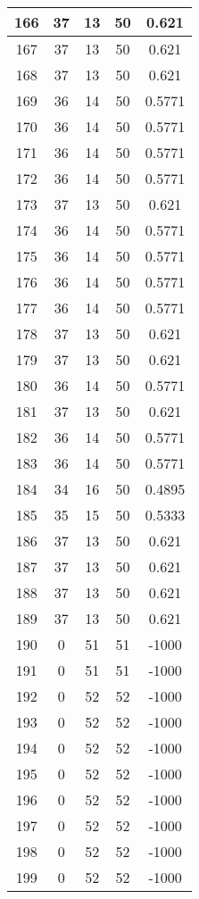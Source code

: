 \documentclass[letterpaper, 12pt]{article}
\begin{document}
\begin{longtable}{|c|c|c|c|c|}
\hline
166 & 37 & 13 & 50 & 0.621 \\
\hline
167 & 37 & 13 & 50 & 0.621 \\
\hline
168 & 37 & 13 & 50 & 0.621 \\
\hline
169 & 36 & 14 & 50 & 0.5771 \\
\hline
170 & 36 & 14 & 50 & 0.5771 \\
\hline
171 & 36 & 14 & 50 & 0.5771 \\
\hline
172 & 36 & 14 & 50 & 0.5771 \\
\hline
173 & 37 & 13 & 50 & 0.621 \\
\hline
174 & 36 & 14 & 50 & 0.5771 \\
\hline
175 & 36 & 14 & 50 & 0.5771 \\
\hline
176 & 36 & 14 & 50 & 0.5771 \\
\hline
177 & 36 & 14 & 50 & 0.5771 \\
\hline
178 & 37 & 13 & 50 & 0.621 \\
\hline
179 & 37 & 13 & 50 & 0.621 \\
\hline
180 & 36 & 14 & 50 & 0.5771 \\
\hline
181 & 37 & 13 & 50 & 0.621 \\
\hline
182 & 36 & 14 & 50 & 0.5771 \\
\hline
183 & 36 & 14 & 50 & 0.5771 \\
\hline
184 & 34 & 16 & 50 & 0.4895 \\
\hline
185 & 35 & 15 & 50 & 0.5333 \\
\hline
186 & 37 & 13 & 50 & 0.621 \\
\hline
187 & 37 & 13 & 50 & 0.621 \\
\hline
188 & 37 & 13 & 50 & 0.621 \\
\hline
189 & 37 & 13 & 50 & 0.621 \\
\hline
190 & 0 & 51 & 51 & -1000 \\
\hline
191 & 0 & 51 & 51 & -1000 \\
\hline
192 & 0 & 52 & 52 & -1000 \\
\hline
193 & 0 & 52 & 52 & -1000 \\
\hline
194 & 0 & 52 & 52 & -1000 \\
\hline
195 & 0 & 52 & 52 & -1000 \\
\hline
196 & 0 & 52 & 52 & -1000 \\
\hline
197 & 0 & 52 & 52 & -1000 \\
\hline
198 & 0 & 52 & 52 & -1000 \\
\hline
199 & 0 & 52 & 52 & -1000 \\
\hline
\end{longtable}
\end{document}
